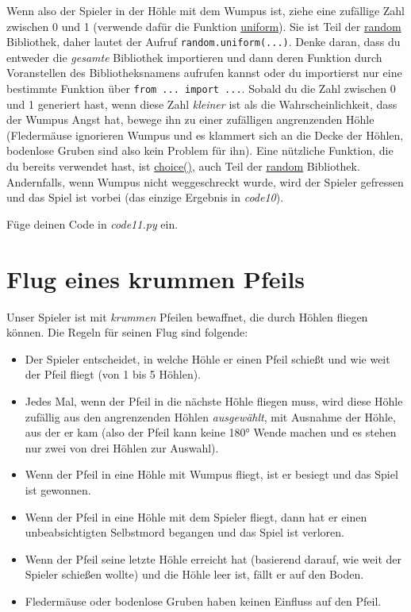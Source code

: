 \documentclass[
]{book}
\providecommand{\tightlist}{%
  \setlength{\itemsep}{0pt}\setlength{\parskip}{0pt}}
\begin{document}
Wenn also der Spieler in der Höhle mit dem Wumpus ist, ziehe eine zufällige Zahl zwischen 0 und 1 (verwende dafür die Funktion \href{https://docs.python.org/3/library/random.html\#random.uniform}{uniform}). Sie ist Teil der \href{https://docs.python.org/3/library/random.html}{random} Bibliothek, daher lautet der Aufruf \texttt{random.uniform(...)}. Denke daran, dass du entweder die \emph{gesamte} Bibliothek importieren und dann deren Funktion durch Voranstellen des Bibliotheksnamens aufrufen kannst oder du importierst nur eine bestimmte Funktion über \texttt{from\ ...\ import\ ...}. Sobald du die Zahl zwischen 0 und 1 generiert hast, wenn diese Zahl \emph{kleiner} ist als die Wahrscheinlichkeit, dass der Wumpus Angst hat, bewege ihn zu einer zufälligen angrenzenden Höhle (Fledermäuse ignorieren Wumpus und es klammert sich an die Decke der Höhlen, bodenlose Gruben sind also kein Problem für ihn). Eine nützliche Funktion, die du bereits verwendet hast, ist \href{https://docs.python.org/3/library/random.html\#random.choice}{choice()}, auch Teil der \href{https://docs.python.org/3/library/random.html}{random} Bibliothek. Andernfalls, wenn Wumpus nicht weggeschreckt wurde, wird der Spieler gefressen und das Spiel ist vorbei (das einzige Ergebnis in \emph{code10}).

Füge deinen Code in \emph{code11.py} ein.

\hypertarget{flug-eines-krummen-pfeils}{%
\section{Flug eines krummen Pfeils}\label{flug-eines-krummen-pfeils}}

Unser Spieler ist mit \emph{krummen} Pfeilen bewaffnet, die durch Höhlen fliegen können. Die Regeln für seinen Flug sind folgende:

\begin{itemize}
\tightlist
\item
  Der Spieler entscheidet, in welche Höhle er einen Pfeil schießt und wie weit der Pfeil fliegt (von 1 bis 5 Höhlen).
\item
  Jedes Mal, wenn der Pfeil in die nächste Höhle fliegen muss, wird diese Höhle zufällig aus den angrenzenden Höhlen \emph{ausgewählt}, mit Ausnahme der Höhle, aus der er kam (also der Pfeil kann keine 180° Wende machen und es stehen nur zwei von drei Höhlen zur Auswahl).
\item
  Wenn der Pfeil in eine Höhle mit Wumpus fliegt, ist er besiegt und das Spiel ist gewonnen.
\item
  Wenn der Pfeil in eine Höhle mit dem Spieler fliegt, dann hat er einen unbeabsichtigten Selbstmord begangen und das Spiel ist verloren.
\item
  Wenn der Pfeil seine letzte Höhle erreicht hat (basierend darauf, wie weit der Spieler schießen wollte) und die Höhle leer ist, fällt er auf den Boden.
\item
  Fledermäuse oder bodenlose Gruben haben keinen Einfluss auf den Pfeil.
\end{itemize}
\end{document}
